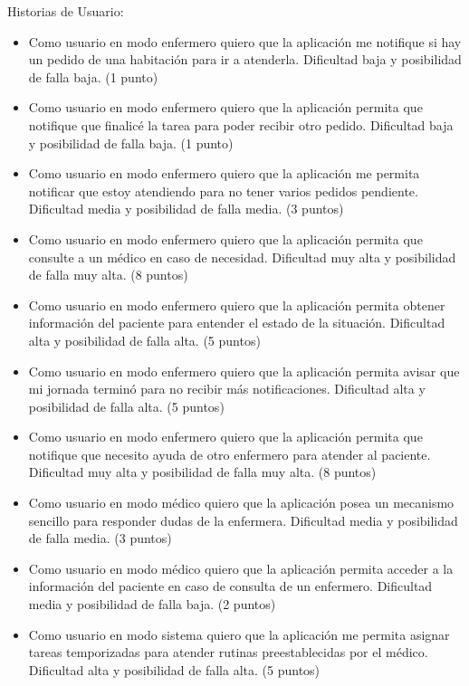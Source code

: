 \documentclass[
11pt, %
]{charter}
\begin{document}
Historias de Usuario:

\begin{itemize}
\item Como usuario en modo enfermero quiero que la aplicación me notifique si hay un pedido de una habitación para ir a atenderla. Dificultad baja y posibilidad de falla  baja. (1 punto)

\item Como usuario en modo enfermero quiero que la aplicación permita que notifique que finalicé la tarea para poder recibir otro pedido. Dificultad baja y posibilidad de falla  baja. (1 punto)

\item Como usuario en modo enfermero quiero que la aplicación me permita notificar que estoy atendiendo para no tener varios pedidos pendiente. Dificultad media y posibilidad de falla media. (3 puntos)

\item Como usuario en modo enfermero quiero que la aplicación permita que consulte a un médico en caso de necesidad. Dificultad muy alta y posibilidad de falla muy alta. (8 puntos)

\item Como usuario en modo enfermero quiero que la aplicación permita obtener información del paciente para entender el estado de la situación. Dificultad alta y posibilidad de falla alta. (5 puntos)

\item Como usuario en modo enfermero quiero que la aplicación permita avisar que mi jornada terminó para no recibir más notificaciones. Dificultad alta y posibilidad de falla alta. (5 puntos)

\item Como usuario en modo enfermero quiero que la aplicación permita que notifique que necesito ayuda de otro enfermero para atender al paciente. Dificultad muy alta y posibilidad de falla muy alta. (8 puntos)

\item Como usuario en modo médico quiero que la aplicación posea un mecanismo sencillo para responder dudas de la enfermera. Dificultad media y posibilidad de falla media. (3 puntos)

\item Como usuario en modo médico quiero que la aplicación permita acceder a la información del paciente en caso de consulta de un enfermero. Dificultad media y posibilidad de falla baja. (2 puntos)

\item Como usuario en modo sistema quiero que la aplicación me permita asignar tareas temporizadas para atender rutinas preestablecidas por el médico. Dificultad alta y posibilidad de falla alta. (5 puntos)


\end{itemize}
\end{document}
